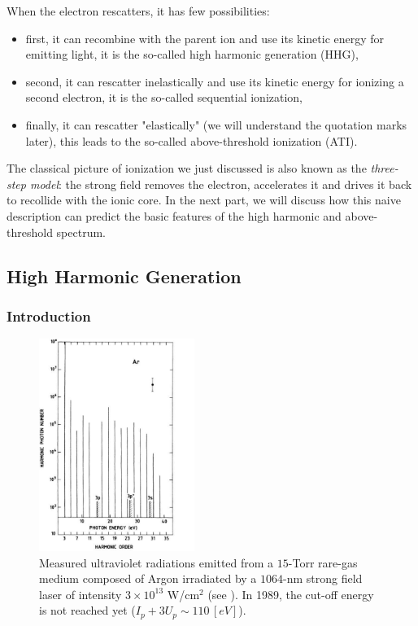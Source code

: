 \documentclass[a4paper]{article}
\begin{document}
\par 
When the electron rescatters, it has few possibilities:
\begin{itemize}
\item
first, it can recombine with the parent ion and use its kinetic energy for emitting light, it is the so-called high harmonic generation (HHG),
\item
second, it can rescatter inelastically and use its kinetic energy for ionizing a second electron, it is the so-called sequential ionization,
\item
finally, it can rescatter "elastically" (we will understand the quotation marks later), this leads to the so-called above-threshold ionization (ATI).
\end{itemize}
The classical picture of ionization we just discussed is also known as the \textit{three-step model}:
the strong field removes the electron, accelerates it and drives it back to recollide with the ionic core.
In the next part, we will discuss how this naive description can predict the basic features of the high harmonic and above-threshold spectrum.

\subsection{High Harmonic Generation}
\subsubsection{Introduction}

\begin{figure}
\vspace{-70pt} 
\begin{center}
\includegraphics[width=0.45\textwidth]{data/lhuillier_HHG.pdf} 
\end{center} 
\vspace{-10pt} 
\caption{Measured ultraviolet radiations emitted from a $15$-Torr rare-gas medium composed of Argon irradiated by a $1064$-nm strong field laser of intensity $3\times10^{13}$ W/cm$^{2}$ (see \cite{Li_1989}). In 1989, the cut-off energy is not reached yet ($I_{p}+3U_{p}\sim 110\,[eV]$).}
\label{Lhuillier_HHG} 
\vspace{-20pt} 
\end{figure}
\end{document}
